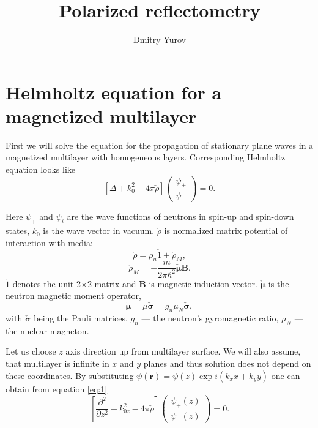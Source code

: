 \documentclass[12pt,a4paper]{article}
\author{Dmitry Yurov}
\title{Polarized reflectometry}
\begin{document}
\maketitle
\section{Helmholtz equation for a magnetized multilayer}

First we will solve the equation for the propagation of stationary plane waves in a magnetized multilayer with homogeneous layers.
Corresponding Helmholtz equation looks like
\begin{equation} \label{eq:1}
\left[ \Delta + k_0^2 - 4 \pi \check{\rho} \right]
\left(
	\begin{matrix}
		\psi_{+} \\
		\psi_{-}
	\end{matrix}
\right)
= 0.
\end{equation}

Here $\psi_{+}$ and $\psi_{i}$ are the wave functions of neutrons in spin-up and spin-down states, $k_0$ is the wave vector in vacuum.
$\check{\rho}$ is normalized matrix potential of interaction with media:
\begin{equation}
\check{\rho} = \rho_n \check{1} + \check{\rho}_M,
\end{equation}
\begin{equation}
\check{\rho}_M = -\frac{m}{2 \pi \hbar^2} \boldsymbol{\check{\mu}} \boldsymbol{B}.
\end{equation}
$\check{1}$ denotes the unit 2$\times$2 matrix and $\boldsymbol{B}$ is magnetic induction vector. $\boldsymbol{\check{\mu}}$ is the neutron magnetic moment operator,
\begin{equation}
\boldsymbol{\check{\mu}} = \mu \boldsymbol{\check{\sigma}} = g_n \mu_N \boldsymbol{\check{\sigma}},
\end{equation}
with $\boldsymbol{\check{\sigma}}$ being the Pauli matrices, $g_n$ --- the neutron's gyromagnetic ratio, $\mu_N$ --- the nuclear magneton.

Let us choose $z$ axis direction up from multilayer surface. We will also assume, that multilayer is infinite in $x$ and $y$ planes and thus solution does not depend on these coordinates. By substituting $\psi(\boldsymbol{r}) = \psi(z) \exp{i (k_x x + k_y y)}$ one can obtain from equation \ref{eq:1}
\begin{equation} \label{eq:5}
\left[ \frac{\partial^2}{\partial z^2} + k_{0z}^2 - 4 \pi \check{\rho} \right]
\left(
	\begin{matrix}
		\psi_{+}(z) \\
		\psi_{-}(z)
	\end{matrix}
\right)
= 0.
\end{equation}
\end{document}
